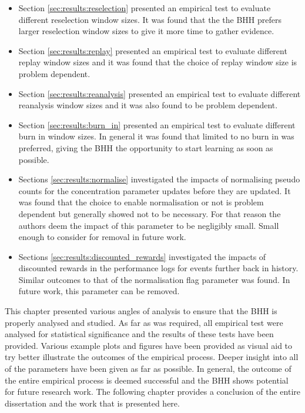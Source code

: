 \begin{itemize}
      \item Section \ref{sec:results:reselection} presented an empirical test to evaluate different reselection window sizes. It was found that the the \Ac{BHH} prefers larger reselection window sizes to give it more time to gather evidence.

      \item Section \ref{sec:results:replay} presented an empirical test to evaluate different replay window sizes and it was found that the choice of replay window size is problem dependent.

      \item Section \ref{sec:results:reanalysis} presented an empirical test to evaluate different reanalysis window sizes and it was also found to be problem dependent.

      \item Section \ref{sec:results:burn_in} presented an empirical test to evaluate different burn in window sizes. In general it was found that limited to no burn in was preferred, giving the \Ac{BHH} the opportunity to start learning as soon as possible.

      \item Sections \ref{sec:results:normalise} investigated the impacts of normalising pseudo counts for the concentration parameter updates before they are updated. It was found that the choice to enable normalisation or not is problem dependent but generally showed not to be necessary. For that reason the authors deem the impact of this parameter to be negligibly small. Small enough to consider for removal in future work.

      \item Sections \ref{sec:results:discounted_rewards} investigated the impacts of discounted rewards in the performance logs for events further back in history. Similar outcomes to that of the normalisation flag parameter was found. In future work, this parameter can be removed.
\end{itemize}

This chapter presented various angles of analysis to ensure that the \Ac{BHH} is properly analysed and studied. As far as was required, all empirical test were analysed for statistical significance and the results of these tests have been provided. Various example plots and figures have been provided as visual aid to try better illustrate the outcomes of the empirical process. Deeper insight into all of the parameters have been given as far as possible. In general, the outcome of the entire empirical process is deemed successful and the \Ac{BHH} shows potential for future research work. The following chapter provides a conclusion of the entire dissertation and the work that is presented here.
